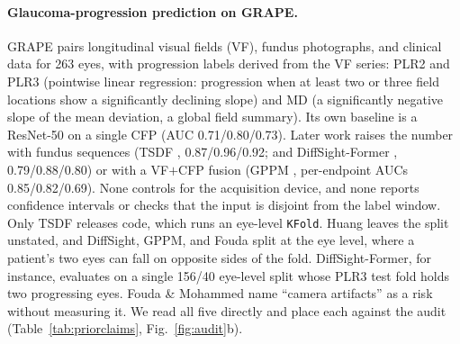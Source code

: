 \paragraph{Glaucoma-progression prediction on GRAPE.} GRAPE \citep{huang2023grape} pairs longitudinal visual fields
(VF), fundus photographs, and clinical data for 263 eyes, with progression labels derived from the VF series: PLR2 and
PLR3 (pointwise linear regression: progression when at least two or three field locations show a significantly
declining slope) and MD (a significantly negative slope of the mean deviation, a global field summary). Its own baseline is a ResNet-50 on a single CFP (AUC \num{0.71}/\num{0.80}/\num{0.73}).
Later work raises the number with fundus sequences (TSDF \citep{song2025tsdf}, \num{0.87}/\num{0.96}/\num{0.92}; and
DiffSight-Former \citep{huang2026diffsight}, \num{0.79}/\num{0.88}/\num{0.80}) or with a VF$+$CFP fusion (GPPM
\citep{zheng2025gppm}, per-endpoint AUCs \num{0.85}/\num{0.82}/\num{0.69}). None controls for the acquisition device,
and none reports confidence intervals or checks that the input is disjoint from the label window. Only TSDF releases
code, which runs an eye-level \texttt{KFold}. Huang leaves the split unstated, and DiffSight, GPPM, and Fouda split at
the eye level, where a patient's two eyes can fall on opposite sides of the fold. DiffSight-Former, for instance,
evaluates on a single \num{156}/\num{40} eye-level split whose PLR3 test fold holds two progressing eyes. Fouda \&
Mohammed \citep{fouda2025} name ``camera artifacts'' as a risk without measuring it. We read all five directly and place each against the audit (Table~\ref{tab:priorclaims},
Fig.~\ref{fig:audit}b).

